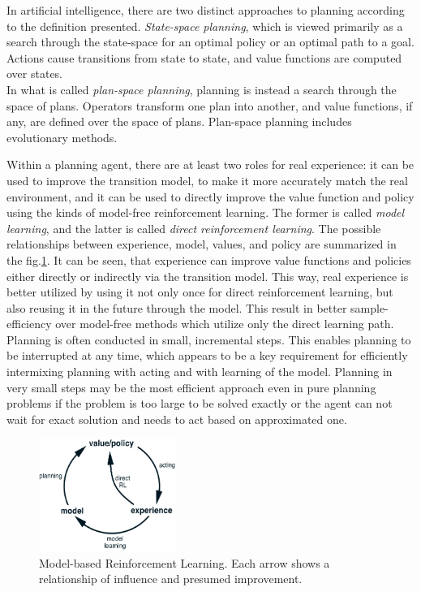 In artificial intelligence, there are two distinct approaches to planning according to the definition presented. \textit{State-space planning}, which is viewed primarily as a search through the state-space for an optimal policy or an optimal path to a goal. Actions cause transitions from state to state, and value functions are computed over states. \\
In what is called \textit{plan-space planning}, planning is instead a search through the space of plans. Operators transform one plan into another, and value functions, if any, are defined over the space of plans. Plan-space planning includes evolutionary methods.

Within a planning agent, there are at least two roles for real experience: it can be used to improve the transition model, to make it more accurately match the real environment, and it can be used to directly improve the value function and policy using the kinds of model-free reinforcement learning. The former is called \textit{model learning}, and the latter is called \textit{direct reinforcement learning}. The possible relationships between experience, model, values, and policy are summarized in the fig.\ref{Fig.ModelBasedRL}. It can be seen, that experience can improve value functions and policies either directly or indirectly via the transition model. This way, real experience is better utilized by using it not only once for direct reinforcement learning, but also reusing it in the future through the model. This result in better sample-efficiency over model-free methods which utilize only the direct learning path. \\
Planning is often conducted in small, incremental steps. This enables planning to be interrupted at any time, which appears to be a key requirement for efficiently intermixing planning with acting and with learning of the model. Planning in very small steps may be the most efficient approach even in pure planning problems if the problem is too large to be solved exactly or the agent can not wait for exact solution and needs to act based on approximated one.

\begin{figure}[H]
\includegraphics[width=0.4\textwidth,keepaspectratio]{figures/ModelBasedRL.png}
\caption{Model-based Reinforcement Learning. \protect\cite{Book.RLAI} Each arrow shows a relationship of influence and presumed improvement.}
\label{Fig.ModelBasedRL}
\end{figure}

